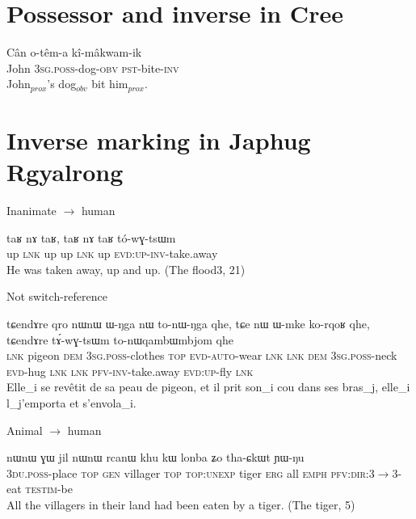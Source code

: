 \documentclass[oldfontcommands,oneside,a4paper,11pt]{article}
\newcommand{\ipa}[1]{{\phon #1}} %
\begin{document}
 
\section{Possessor and inverse in Cree}


\begin{exe}
\ex \label{ex:cree-poss}
\gll Cân o-têm-a kî-mâkwam-ik \\
John \textsc{3sg.poss}-dog-\textsc{obv} \textsc{pst}-bite-\textsc{inv} \\
\glt John$_{prox}$'s dog$_{obv}$ bit him$_{prox}$.  
\end{exe}

\section{Inverse marking in Japhug Rgyalrong}

Inanimate $\rightarrow$ human
 \begin{exe}
\ex \label{ex:taR.nA.taR} 
\gll
\ipa{taʁ}   	\ipa{nɤ}   	\ipa{taʁ,}   	\ipa{taʁ}   	\ipa{nɤ}   	\ipa{taʁ}   	\ipa{tó-wɣ-tsɯm}   \\
up \textsc{lnk} up up \textsc{lnk} up \textsc{evd:up-inv-}take.away \\
\glt He was taken away, up and up. (The flood3, 21)
\end{exe}

Not switch-reference
 \begin{exe}
\ex \label{ex:towgtsWm} 
\gll
\ipa{tɕendɤre} 	\ipa{qro} 	\ipa{nɯnɯ} 	\ipa{ɯ-ŋga} 	\ipa{nɯ} 	\ipa{to-nɯ-ŋga} 	\ipa{qhe,}  \ipa{tɕe} 	\ipa{nɯ} 	\ipa{ɯ-mke} 	\ipa{ko-rqoʁ} 	\ipa{qhe,} \ipa{tɕendɤre} 	\ipa{tɤ́-wɣ-tsɯm} 	\ipa{to-nɯqambɯmbjom} 	\ipa{qhe} \\
\textsc{lnk} pigeon \textsc{dem} \textsc{3sg.poss}-clothes \textsc{top} \textsc{evd-auto}-wear \textsc{lnk} \textsc{lnk} \textsc{dem} \textsc{3sg.poss}-neck \textsc{evd}-hug \textsc{lnk} \textsc{lnk} \textsc{pfv-inv}-take.away \textsc{evd:up}-fly \textsc{lnk} \\
\glt Elle_i se revêtit de sa peau de pigeon, et il prit son_i cou dans ses bras_j, elle_i l_j'emporta et s'envola_i.
\end{exe}

Animal $\rightarrow$ human
\begin{exe}
\ex
\gll  	\ipa{ndʑi-sɤtɕha} 	\ipa{nɯnɯ} 	\ipa{ɣɯ} 	\ipa{jil} 	\ipa{nɯnɯ} 	\ipa{rcanɯ} 	\ipa{khu} 	\ipa{kɯ} 	\ipa{lonba} 	\ipa{ʑo} 	\ipa{tha-ɕkɯt} 	\ipa{ɲɯ-ŋu}  \\
\textsc{3du.poss}-place \textsc{top} \textsc{gen} villager \textsc{top} \textsc{top:unexp} tiger \textsc{erg} all \textsc{emph} \textsc{pfv:dir:3}$\rightarrow$3-eat \textsc{testim}-be \\
 \glt All the villagers in their land had been eaten by a tiger.  (The tiger, 5)
\end{exe}
\end{document}
